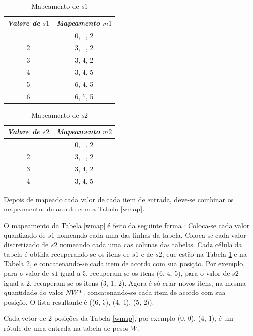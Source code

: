 \begin{table}[ht]
	\centering
	\caption{Mapeamento de $s1$}
	\label{disc_s1}
	\ABNTEXfontereduzida
	\begin{tabular}{c c}
		\toprule
		\textit{Valore de $s1$} & \textit{Mapeamento $m1$}\\
		\midrule
		\ABNTEXfontereduzida
		1 & 0, 1, 2 \\
		2 & 3, 1, 2 \\
		3 & 3, 4, 2 \\
		4 & 3, 4, 5 \\
		5 & 6, 4, 5 \\
		6 & 6, 7, 5 \\
		\bottomrule
	\end{tabular}
\end{table}
\begin{table}[ht]
	\centering
	\caption{Mapeamento de $s2$}
	\label{disc_s2}
	\ABNTEXfontereduzida
	\begin{tabular}{c c}
		\toprule
		\textit{Valore de $s2$} & \textit{Mapeamento $m2$}\\
		\midrule
		\ABNTEXfontereduzida
		1 & 0, 1, 2 \\
		2 & 3, 1, 2 \\
		3 & 3, 4, 2 \\
		4 & 3, 4, 5 \\
		\bottomrule
	\end{tabular}
\end{table}


Depois de mapeado cada valor de cada item de entrada, deve-se combinar os mapeamentos de acordo com a Tabela \ref{wmap}.

O mapeamento da Tabela \ref{wmap} é feito da seguinte forma \cite{Albus1975b}: 
Coloca-se cada valor quantizado de $s1$ nomeando cada uma das linhas da tabela. 
Coloca-se cada valor discretizado de $s2$ nomeando cada uma das colunas das tabelas. 
Cada célula da tabela é obtida recuperando-se os itens de $s1$ e de $s2$, que estão na Tabela \ref{disc_s1} e na Tabela \ref{disc_s2}, e concatenando-se cada item de acordo com sua posição. 
Por exemplo, para o valor de $s1$ igual a 5, recuperam-se os itens (6, 4, 5), para o valor de $s2$ igual a 2, recuperam-se os itens (3, 1, 2). 
Agora é só criar novos itens, na mesma quantidade do valor $NW*$, concatenando-se cada item de acordo com sua posição. O lista resultante é ((6, 3), (4, 1), (5, 2)). 

Cada vetor de 2 posições da Tabela \ref{wmap}, por exemplo (0, 0), (4, 1), é um rótulo de uma entrada na tabela de pesos $W$.


